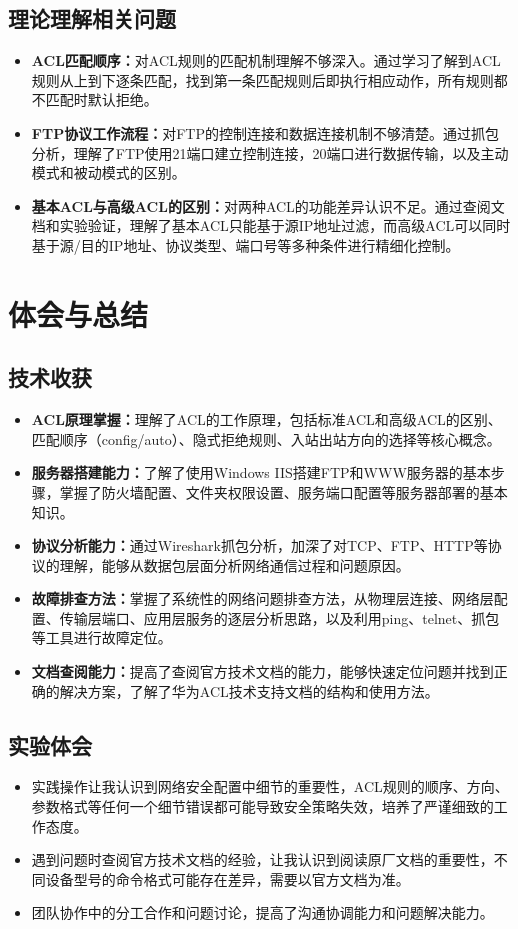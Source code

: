 \documentclass[a4paper]{article}
\begin{document}
\subsection{理论理解相关问题}
\begin{itemize}
    \item \textbf{ACL匹配顺序：}对ACL规则的匹配机制理解不够深入。通过学习了解到ACL规则从上到下逐条匹配，找到第一条匹配规则后即执行相应动作，所有规则都不匹配时默认拒绝。
    \item \textbf{FTP协议工作流程：}对FTP的控制连接和数据连接机制不够清楚。通过抓包分析，理解了FTP使用21端口建立控制连接，20端口进行数据传输，以及主动模式和被动模式的区别。
    \item \textbf{基本ACL与高级ACL的区别：}对两种ACL的功能差异认识不足。通过查阅文档和实验验证，理解了基本ACL只能基于源IP地址过滤，而高级ACL可以同时基于源/目的IP地址、协议类型、端口号等多种条件进行精细化控制。
\end{itemize}

\section{体会与总结}
\subsection{技术收获}
\begin{itemize}
    \item \textbf{ACL原理掌握：}理解了ACL的工作原理，包括标准ACL和高级ACL的区别、匹配顺序（config/auto）、隐式拒绝规则、入站出站方向的选择等核心概念。
    \item \textbf{服务器搭建能力：}了解了使用Windows IIS搭建FTP和WWW服务器的基本步骤，掌握了防火墙配置、文件夹权限设置、服务端口配置等服务器部署的基本知识。
    \item \textbf{协议分析能力：}通过Wireshark抓包分析，加深了对TCP、FTP、HTTP等协议的理解，能够从数据包层面分析网络通信过程和问题原因。
    \item \textbf{故障排查方法：}掌握了系统性的网络问题排查方法，从物理层连接、网络层配置、传输层端口、应用层服务的逐层分析思路，以及利用ping、telnet、抓包等工具进行故障定位。
    \item \textbf{文档查阅能力：}提高了查阅官方技术文档的能力，能够快速定位问题并找到正确的解决方案，了解了华为ACL技术支持文档的结构和使用方法。
\end{itemize}

\subsection{实验体会}
\begin{itemize}
    \item 实践操作让我认识到网络安全配置中细节的重要性，ACL规则的顺序、方向、参数格式等任何一个细节错误都可能导致安全策略失效，培养了严谨细致的工作态度。
    \item 遇到问题时查阅官方技术文档的经验，让我认识到阅读原厂文档的重要性，不同设备型号的命令格式可能存在差异，需要以官方文档为准。
    \item 团队协作中的分工合作和问题讨论，提高了沟通协调能力和问题解决能力。
\end{itemize}
\end{document}
